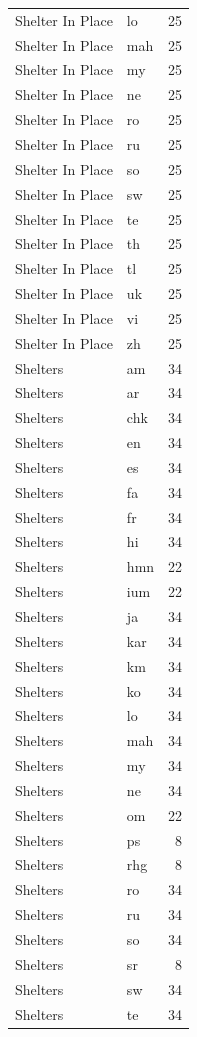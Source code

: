\begin{longtable}{p{3cm} p{3cm} r}
Shelter In Place & lo & 25 \\
Shelter In Place & mah & 25 \\
Shelter In Place & my & 25 \\
Shelter In Place & ne & 25 \\
Shelter In Place & ro & 25 \\
Shelter In Place & ru & 25 \\
Shelter In Place & so & 25 \\
Shelter In Place & sw & 25 \\
Shelter In Place & te & 25 \\
Shelter In Place & th & 25 \\
Shelter In Place & tl & 25 \\
Shelter In Place & uk & 25 \\
Shelter In Place & vi & 25 \\
Shelter In Place & zh & 25 \\
Shelters & am & 34 \\
Shelters & ar & 34 \\
Shelters & chk & 34 \\
Shelters & en & 34 \\
Shelters & es & 34 \\
Shelters & fa & 34 \\
Shelters & fr & 34 \\
Shelters & hi & 34 \\
Shelters & hmn & 22 \\
Shelters & ium & 22 \\
Shelters & ja & 34 \\
Shelters & kar & 34 \\
Shelters & km & 34 \\
Shelters & ko & 34 \\
Shelters & lo & 34 \\
Shelters & mah & 34 \\
Shelters & my & 34 \\
Shelters & ne & 34 \\
Shelters & om & 22 \\
Shelters & ps & 8 \\
Shelters & rhg & 8 \\
Shelters & ro & 34 \\
Shelters & ru & 34 \\
Shelters & so & 34 \\
Shelters & sr & 8 \\
Shelters & sw & 34 \\
Shelters & te & 34 \\

\end{longtable}

